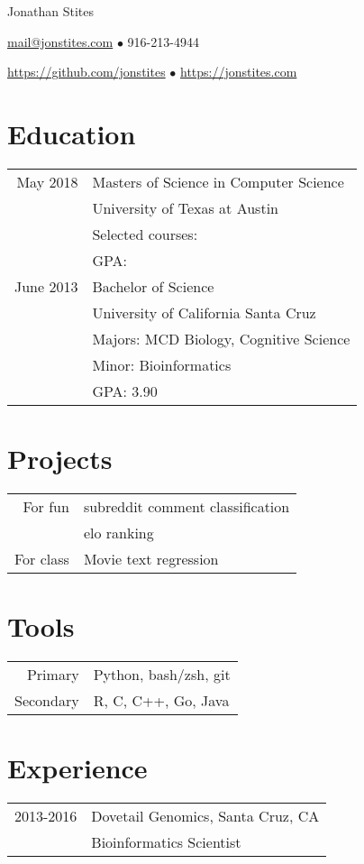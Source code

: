 \documentclass[12pt]{article}
\begin{document}
\begin{center}
{\Huge Jonathan Stites}

{\href{mailto:mail+resume@jonstites.com}{mail@jonstites.com}}
$\bullet$
916-213-4944

{\href{https://github.com/jonstites}{https://github.com/jonstites}}
$\bullet$
{\href{https://jonstites.com}{https://jonstites.com}}
\end{center}

\section{Education}
\begin{tabular}{rl}
May 2018  & Masters of Science in Computer Science \\
          & University of Texas at Austin \\
          & Selected courses: \\
          & GPA: \\
June 2013 & Bachelor of Science \\
		  &  University of California Santa Cruz	\\
		  &  Majors: MCD Biology, Cognitive Science \\
		  &  Minor: Bioinformatics \\
		  &  GPA: 3.90 \\
\end{tabular}

\section{Projects}
\begin{tabular}{rl}
For fun & subreddit comment classification \\
		& elo ranking \\
For class & Movie text regression \\
\end{tabular}

\section{Tools}
\begin{tabular}{rl}
Primary  & Python, bash/zsh, git \\
Secondary & R, C, C++, Go, Java \\
\end{tabular}

\section{Experience}
\begin{tabular}{rl}
2013-2016 & Dovetail Genomics, Santa Cruz, CA \\
& Bioinformatics Scientist \\
\end{tabular}
\end{document}
